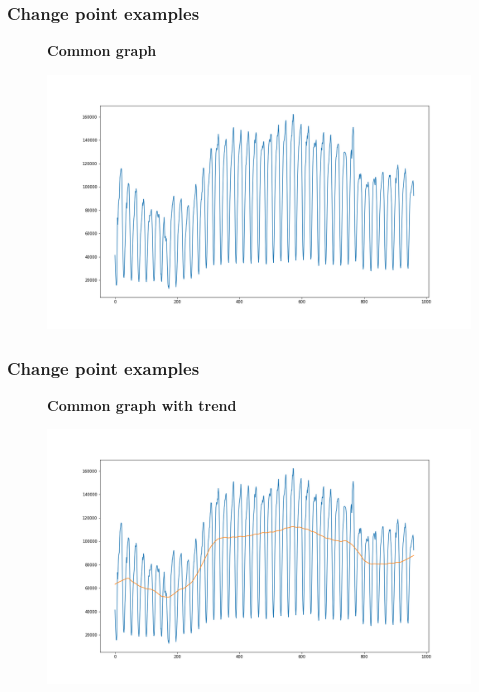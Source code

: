 \documentclass[intlimits, 9pt, unicode]{beamer}
\begin{document}
\begin{frame}
\frametitle{Change point examples}
\begin{figure}
\textbf{Common graph}\par\medskip
\includegraphics[scale=0.30]{images/001_normal_1}
\end{figure}
\end{frame}

\begin{frame}
\frametitle{Change point examples}
\begin{figure}
\textbf{Common graph with trend}\par\medskip
\includegraphics[scale=0.30]{images/001_normal_2}
\end{figure}
\end{frame}
\end{document}
